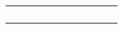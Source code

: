 \begin{table}[h]
\begin{tabular}{|c|c|c|c|c|c|c|c|c|c|}
		&                                                       &                                                       &       &                                                           &                                                                                 &                                                       &                                                                                                &       &      \\ \hline
		&                                                       &                                                       &       &                                                           &                                                                                 &                                                       &                                                                                                &       &      \\ \hline
		&                                                       &                                                       &       &                                                           &                                                                                 &                                                       &                                                                                                &       &      \\ \hline
		&                                                       &                                                       &       &                                                           &                                                                                 &                                                       &                                                                                                &       &      \\ \hline
		&                                                       &                                                       &       &                                                           &                                                                                 &                                                       &                                                                                                &       &      \\ \hline
		
	\end{tabular}
\end{table}